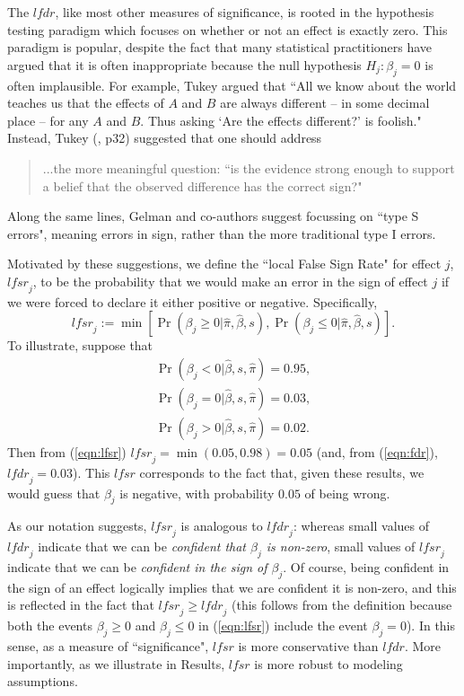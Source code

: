 \documentclass[11pt]{article}
\def\lfdr{\textit{lfdr}}
\def\lfsr{\textit{lfsr}}
\def\bhat{\hat{\beta}}
\begin{document}
The $\lfdr$, like most other measures of significance, is rooted in the hypothesis testing paradigm which focuses on 
whether or not an effect is exactly zero. This paradigm is popular, despite the fact that many statistical practitioners have argued that it is often inappropriate because
the null hypothesis $H_j: \beta_j=0$ is often implausible. For example, Tukey \cite{tukey1991philosophy} argued that
``All we know about the world teaches us that the effects of $A$ and $B$ are always different -- in some decimal place -- for any $A$ and $B$. Thus asking `Are the effects different?' is foolish." Instead, Tukey (\cite{tukey1962future}, p32) suggested  that one should address
\begin{quote}
...the more meaningful question: ``is the evidence strong enough to support a belief that the observed difference has the correct sign?"
\end{quote}
Along the same lines, Gelman and co-authors \cite{gelman2000type, gelman2012we} suggest  
focussing on ``type S errors", meaning errors in sign, rather than the more traditional type I errors.

Motivated by these suggestions, we define the ``local False Sign Rate" for effect $j$, $\lfsr_j$, to be the probability that we
would make an error in the sign of effect $j$ if we were forced to declare it either positive or negative. Specifically,
\begin{equation} \label{eqn:lfsr}
\lfsr_j := \min[ \Pr(\beta_j \geq 0| \hat\pi, \bhat, s), \Pr(\beta_j \leq 0| \hat\pi, \bhat, s) ].
\end{equation}
To illustrate, suppose that 
\begin{gather*}
\Pr(\beta_j < 0| \bhat, s, \hat\pi)=0.95, \\
\Pr(\beta_j =0| \bhat, s, \hat\pi) = 0.03, \\
\Pr(\beta_j >0| \bhat, s, \hat\pi) = 0.02.
\end{gather*} 
Then 
from (\ref{eqn:lfsr}) $\lfsr_j=\min(0.05,0.98)=0.05$ (and, from (\ref{eqn:fdr}), $\lfdr_j=0.03$). This $\lfsr$ corresponds to the fact that, given these results, 
we would guess that $\beta_j$ is negative, with probability $0.05$ of being wrong. 

As our notation suggests, $\lfsr_j$ is analogous to $\lfdr_j$: whereas small values of $\lfdr_j$ indicate that we can be {\it confident that $\beta_j$ is non-zero}, 
small values of $\lfsr_j$ indicate that we can be {\it confident in the sign of $\beta_j$}. 
Of course, being confident in the sign of an effect logically implies that we are confident it is non-zero, and
this is reflected in the fact that $\lfsr_j \geq \lfdr_j$ 
(this follows from the definition because both the events $\beta_j \geq 0$
and $\beta_j \leq 0$ in (\ref{eqn:lfsr}) include the event $\beta_j=0$).
In this sense, as a measure of ``significance", $\lfsr$ is more conservative than $\lfdr$. More importantly, as we illustrate in Results,
$\lfsr$ is more robust to modeling assumptions.
\end{document}
